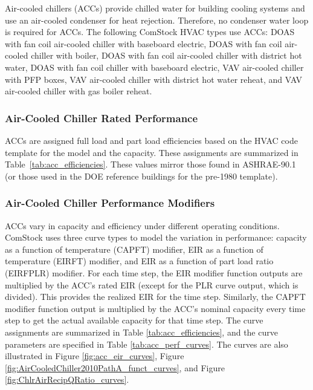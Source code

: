 Air-cooled chillers (ACCs) provide chilled water for building cooling systems and use an air-cooled condenser for heat rejection. Therefore, no condenser water loop is required for ACCs. The following ComStock HVAC types use ACCs: DOAS with fan coil air-cooled chiller with baseboard electric, DOAS with fan coil air-cooled chiller with boiler, DOAS with fan coil air-cooled chiller with district hot water, DOAS with fan coil chiller with baseboard electric, VAV air-cooled chiller with PFP boxes, VAV air-cooled chiller with district hot water reheat, and VAV air-cooled chiller with gas boiler reheat.


\subsubsection{Air-Cooled Chiller Rated Performance}

ACCs are assigned full load and part load efficiencies based on the HVAC code template for the model and the capacity. These assignments are summarized in Table~\ref{tab:acc_efficiencies}. These values mirror those found in ASHRAE-90.1 (or those used in the DOE reference buildings for the pre-1980 template).



\subsubsection{Air-Cooled Chiller Performance Modifiers}

ACCs vary in capacity and efficiency under different operating conditions. ComStock uses three curve types to model the variation in performance: capacity as a function of temperature (CAPFT) modifier, EIR as a function of temperature (EIRFT) modifier, and EIR as a function of part load ratio (EIRFPLR) modifier. For each time step, the EIR modifier function outputs are multiplied by the ACC's rated EIR (except for the PLR curve output, which is divided). This provides the realized EIR for the time step. Similarly, the CAPFT modifier function output is multiplied by the ACC's nominal capacity every time step to get the actual available capacity for that time step. The curve assignments are summarized in Table \ref{tab:acc_efficiencies}, and the curve parameters are specified in Table \ref{tab:acc_perf_curves}. The curves are also illustrated in Figure \ref{fig:acc_eir_curves}, Figure \ref{fig:AirCooledChiller2010PathA_funct_curves}, and Figure \ref{fig:ChlrAirRecipQRatio_curves}.

